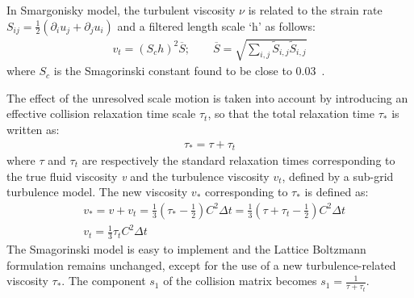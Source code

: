 In Smargonisky model, the turbulent viscosity $\nu$ is related to the strain rate $S_{ij}=\frac{1}{2}(\partial_i u_j + \partial_j u_i)$ and a filtered length scale `h' as follows:
\begin{align}
\mathit{v}_{\mathit{t}}=(\mathit{S}_{c}\mathit{h})^{2}\overline{S}; \qquad \overline{S}=\sqrt{\sum\limits_{\mathit{i,j}}{\tilde{S}_{\mathit{i,j}}\tilde{S}_{\mathit{i,j}}}}
\end{align}
where $\mathit{S}_{c}$ is the Smagorinski constant found to be close to 0.03~\citep{yu2005}. 

The effect of the unresolved scale motion is taken into account by introducing an effective collision relaxation time scale $\tau_{t}$, so that the total relaxation time $\tau_{*}$ is written as:
\begin{align}
\tau_{*}=\tau + \tau_{t}
\end{align} 
where $\tau$ and $\tau_{t}$ are respectively the standard relaxation times corresponding to the true fluid viscosity \textit{v} and the turbulence viscosity $\mathit{v}_{\mathit{t}}$, defined by a sub-grid turbulence model. The new viscosity $\mathit{v}_{*}$ corresponding to $\tau_{*}$ is defined as:
\begin{align}
& \mathit{v}_{*}=\mathit{v}+\mathit{v}_{\mathit{t}}=\frac{1}{3}(\tau_{*}-\frac{1}{2})\mathit{C}^{2} \Delta \mathit{t} =\frac{1}{3}(\tau+\tau_{t}-\frac{1}{2})\mathit{C}^{2} \Delta \mathit{t}  \\
& \mathit{v}_{\mathit{t}}=\frac{1}{3}\tau_{\mathit{t}}\mathit{C}^{2} \Delta \textit{t}
\end{align} 
The Smagorinski model is easy to implement and the Lattice Boltzmann formulation remains unchanged, except for the use of a new turbulence-related viscosity $\tau_{*}$. The component $s_1$ of the collision matrix becomes $s_1 = \frac{1}{\tau+\tau_t}$.
